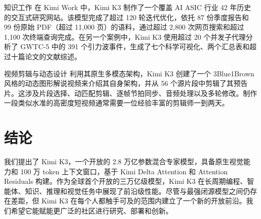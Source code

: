 知识工作 在 Kimi Work 中，Kimi K3 制作了一个覆盖 AI ASIC 行业 42 年历史的交互式研究网站。该模型完成了超过 120 轮迭代优化，依托 87 份季度报告和 99 份原始 PDF（超过 11,000 页）的语料，通过超过 2,800 次网页搜索和超过 1,100 次终端查询完成。在另一个案例中，Kimi K3 使用超过 20 个并发子代理分析了 GWTC-5 中的 391 个引力波事件，生成了七个科学可视化、两个汇总表和超过十篇论文的文献综述。

视频剪辑与动态设计 利用其原生多模态架构，Kimi K3 创建了一个 3Blue1Brown 风格的动态图形解说视频来介绍其自身架构，并从 56 个源片段中剪辑了其预告片。这涉及片段选择、动匹配剪辑、逐帧节拍同步、音频处理以及多轮修改。制作一段类似水准的高密度短视频通常需要一位经验丰富的剪辑师一到两天。

\section{结论}\label{conclusion}

我们提出了 Kimi K3，一个开放的 2.8 万亿参数混合专家模型，具备原生视觉能力和 100 万 token 上下文窗口，基于 Kimi Delta Attention 和 Attention Residuals 构建。作为全球首个开放的三万亿级模型，Kimi K3 在长周期编程、智能体、知识、推理和视觉任务中展现了前沿级性能。尽管与最强闭源模型之间仍存在差距，但 Kimi K3 在每个人都触手可及的范围内建立了一个新的开放前沿。我们希望它能赋能更广泛的社区进行研究、部署和创新。

